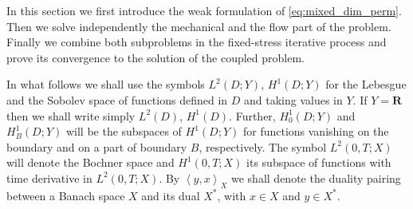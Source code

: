 \documentclass[a4paper]{article}
\def\dual#1#2{\left\langle #1,#2\right\rangle}
\def\Real{{\mathbf R}}
\begin{document}
In this section we first introduce the weak formulation of \eqref{eq:mixed_dim_perm}.
Then we solve independently the mechanical and the flow part of the problem.
Finally we combine both subproblems in the fixed-stress iterative process and prove its convergence to the solution of the coupled problem.

In what follows we shall use the symbols $L^2(D;Y)$, $H^1(D;Y)$ for the Lebesgue and the Sobolev space of functions defined in $D$ and taking values in $Y$.
If $Y=\Real$ then we shall write simply $L^2(D)$, $H^1(D)$.
Further, $H^1_0(D;Y)$ and $H^1_B(D;Y)$ will be the subspaces of $H^1(D;Y)$ for functions vanishing on the boundary and on a part of boundary $B$, respectively.
The symbol $L^2(0,T;X)$ will denote the Bochner space and $H^1(0,T;X)$ its subspace of functions with time derivative in $L^2(0,T;X)$.
By $\dual{y}{x}_X$ we shall denote the duality pairing between a Banach space $X$ and its dual $X^*$, with $x\in X$ and $y\in X^*$.
\end{document}
